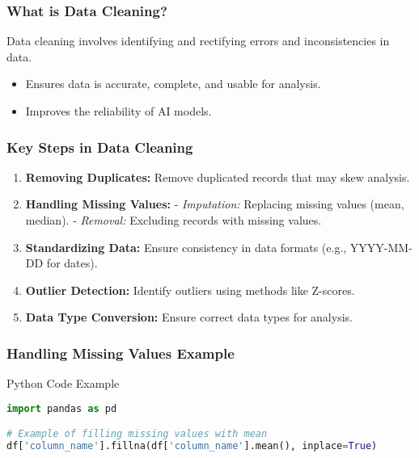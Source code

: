 \documentclass[aspectratio=169]{beamer}
\begin{document}
\begin{frame}
    \frametitle{What is Data Cleaning?}
    Data cleaning involves identifying and rectifying errors and inconsistencies in data. 
    \begin{itemize}
        \item Ensures data is accurate, complete, and usable for analysis.
        \item Improves the reliability of AI models.
    \end{itemize}
\end{frame}

\begin{frame}
    \frametitle{Key Steps in Data Cleaning}
    \begin{enumerate}
        \item \textbf{Removing Duplicates:} 
            Remove duplicated records that may skew analysis.
        \item \textbf{Handling Missing Values:} 
            - \textit{Imputation:} Replacing missing values (mean, median).
            - \textit{Removal:} Excluding records with missing values.
        \item \textbf{Standardizing Data:} 
            Ensure consistency in data formats (e.g., YYYY-MM-DD for dates).
        \item \textbf{Outlier Detection:} 
            Identify outliers using methods like Z-scores.
        \item \textbf{Data Type Conversion:} 
            Ensure correct data types for analysis.
    \end{enumerate}
\end{frame}

\begin{frame}[fragile]
    \frametitle{Handling Missing Values Example}
    \begin{block}{Python Code Example}
    \begin{lstlisting}[language=Python]
import pandas as pd

# Example of filling missing values with mean
df['column_name'].fillna(df['column_name'].mean(), inplace=True)
    \end{lstlisting}
    \end{block}
\end{frame}
\end{document}
